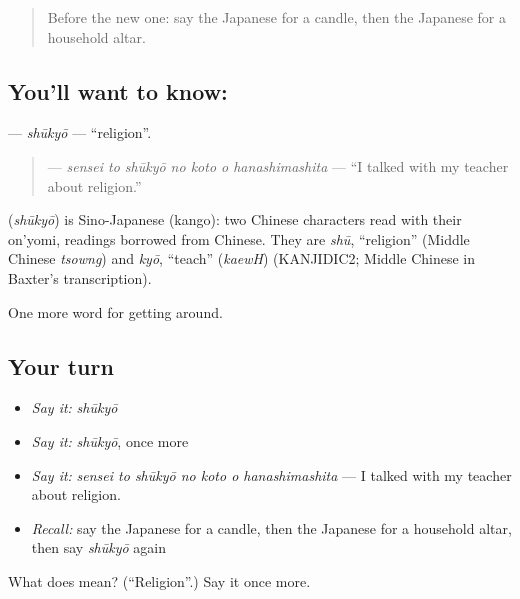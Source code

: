 \begin{quote}
Before the new one: say the Japanese for a candle, then the Japanese for a household altar.
\end{quote}

\subsection*{You'll want to know: }
\textbf{} — \emph{shūkyō} — \textquotedblleft{}religion\textquotedblright{}.

\begin{quote}
\textbf{   } — \emph{sensei to shūkyō no koto o hanashimashita} — \textquotedblleft{}I talked with my teacher about religion.\textquotedblright{}
\end{quote}

\begin{cousinweb}
\textbf{} (\emph{shūkyō}) is Sino-Japanese (kango): two Chinese characters read with their on'yomi, readings borrowed from Chinese. They are \emph{shū}, \textquotedblleft{}religion\textquotedblright{} (Middle Chinese \emph{tsowng}) and \emph{kyō}, \textquotedblleft{}teach\textquotedblright{} (\emph{kaewH}) (KANJIDIC2; Middle Chinese in Baxter's transcription).
\end{cousinweb}

\begin{grammarlens}[title={What you've built}]
One more word for getting around.
\end{grammarlens}

\subsection*{Your turn}
\begin{itemize}
\raggedright
  \item \emph{Say it:} \emph{shūkyō}
  \item \emph{Say it:} \emph{shūkyō}, once more
  \item \emph{Say it:} \emph{sensei to shūkyō no koto o hanashimashita} — I talked with my teacher about religion.
  \item \emph{Recall:} say the Japanese for a candle, then the Japanese for a household altar, then say \emph{shūkyō} again
\end{itemize}

\begin{tcolorbox}[breakable,colback=teal!4,colframe=teal!35!black,title={Before you move on}]
What does  mean? (\textquotedblleft{}Religion\textquotedblright{}.) Say it once more.
\end{tcolorbox}
